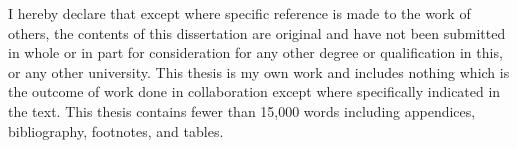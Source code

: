 
\begin{declaration}

I hereby declare that except where specific reference is made to the work of 
others, the contents of this dissertation are original and have not been 
submitted in whole or in part for consideration for any other degree or 
qualification in this, or any other university. This thesis is my own 
work and includes nothing which is the outcome of work done in collaboration 
except where specifically indicated in the text. This 
thesis contains fewer than 15,000 words including appendices, 
bibliography, footnotes, and tables. 


\end{declaration}

